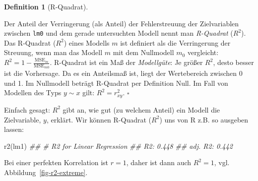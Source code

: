 \documentclass[
  letterpaper,
  twoside,
  open=any]{scrbook}
\newenvironment{Shaded}{\begin{snugshade}}{\end{snugshade}}
\newcommand{\DocumentationTok}[1]{\textcolor[rgb]{0.37,0.37,0.37}{\textit{#1}}}
\newcommand{\FunctionTok}[1]{\textcolor[rgb]{0.28,0.35,0.67}{#1}}
\newcommand{\NormalTok}[1]{\textcolor[rgb]{0.00,0.23,0.31}{#1}}
\theoremstyle{definition}
\newtheorem{definition}{Definition}[chapter]
\theoremstyle{definition}
\theoremstyle{definition}
\theoremstyle{remark}
\begin{document}
\begin{definition}[R-Quadrat]\protect\hypertarget{def-r2}{}\label{def-r2}

Der Anteil der Verringerung (als Anteil) der Fehlerstreuung der
Zielvariablen zwischen \texttt{lm0} und dem gerade untersuchten Modell
nennt man \emph{R-Quadrat} (\(R^2\)). Das R-Quadrat (\(R^2\)) eines
Modells \(m\) ist definiert als die Verringerung der Streuung, wenn man
das Modell \(m\) mit dem Nullmodell \(m_0\) vergleicht:
\(R^2 =1-  \frac{\text{MSE}_{m}}{\text{MSE}_{m0}}\). R-Quadrat ist ein
Maß der \emph{Modellgüte}: Je größer \(R^2\), desto besser ist die
Vorhersage. Da es ein Anteilsmaß ist, liegt der Wertebereich zwischen 0
und 1. Im Nullmodell beträgt R-Quadrat per Definition Null. Im Fall von
Modellen des Typs \(y\sim x\) gilt: \(R^2 = r_{xy}^2\). \(\square\)

\end{definition}

Einfach gesagt: \(R^2\) gibt an, wie gut (zu welchem Anteil) ein Modell
die Zielvariable, \(y\), erklärt. Wir können R-Quadrat (\(R^2\)) uns von
R z.B. so ausgeben lassen:

\begin{Shaded}
\begin{Highlighting}[]
\FunctionTok{r2}\NormalTok{(lm1)}
\DocumentationTok{\#\# \# R2 for Linear Regression}
\DocumentationTok{\#\#        R2: 0.448}
\DocumentationTok{\#\#   adj. R2: 0.442}
\end{Highlighting}
\end{Shaded}

Bei einer perfekten Korrelation ist \(r=1\), daher ist dann auch
\(R^2 = 1\), vgl. Abbildung~\ref{fig-r2-extreme}.
\end{document}
